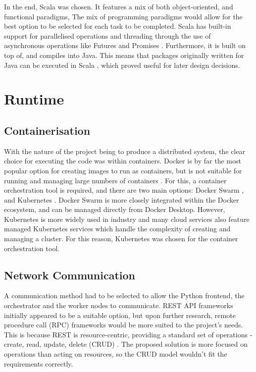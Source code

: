 In the end, Scala was chosen. It features a mix of both object-oriented, and functional paradigms, The mix of programming paradigms would allow for the best option to be selected for each task to be completed. Scala has built-in support for parallelised operations and threading through the use of asynchronous operations like Futures and Promises . Furthermore, it is built on top of, and compiles into Java. This means that packages originally written for Java can be executed in Scala , which proved useful for later design decisions.
 
\section{Runtime}
\subsection{Containerisation}
With the nature of the project being to produce a distributed system, the clear choice for executing the code was within containers. Docker  is by far the most popular option for creating images to run as containers, but is not suitable for running and managing large numbers of containers . For this, a container orchestration tool is required, and there are two main options: Docker Swarm , and Kubernetes . Docker Swarm is more closely integrated within the Docker ecosystem, and can be managed directly from Docker Desktop. However, Kubernetes is more widely used in industry  and many cloud services also feature  managed Kubernetes services which handle the complexity of creating and managing a cluster. For this reason, Kubernetes was chosen for the container orchestration tool.

\subsection{Network Communication} 
A communication method had to be selected to allow the Python frontend, the orchestrator and the worker nodes to communicate. REST API frameworks initially appeared to be a suitable option, but upon further research, remote procedure call (RPC) frameworks would be more suited to the project's needs. This is because REST is resource-centric, providing a standard set of operations - create, read, update, delete (CRUD) . The proposed solution is more focused on operations than acting on resources, so the CRUD model wouldn't fit the requirements correctly. 

